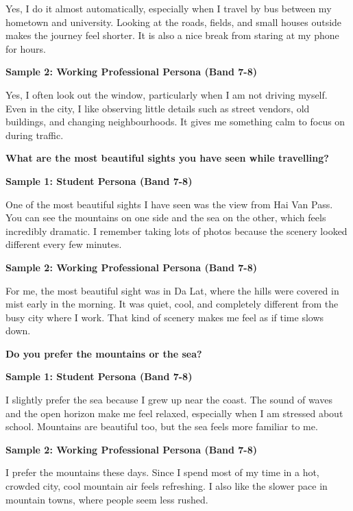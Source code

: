 Yes, I do it almost automatically, especially when I travel by bus between my hometown and university. Looking at the roads, fields, and small houses outside makes the journey feel shorter. It is also a nice break from staring at my phone for hours.

\textbf{Sample 2: Working Professional Persona (Band 7-8)}

Yes, I often look out the window, particularly when I am not driving myself. Even in the city, I like observing little details such as street vendors, old buildings, and changing neighbourhoods. It gives me something calm to focus on during traffic.

\separator

\begin{ieltsquestion}
\textbf{What are the most beautiful sights you have seen while travelling?}
\end{ieltsquestion}
\textbf{Sample 1: Student Persona (Band 7-8)}

One of the most beautiful sights I have seen was the view from Hai Van Pass. You can see the mountains on one side and the sea on the other, which feels incredibly dramatic. I remember taking lots of photos because the scenery looked different every few minutes.

\textbf{Sample 2: Working Professional Persona (Band 7-8)}

For me, the most beautiful sight was in Da Lat, where the hills were covered in mist early in the morning. It was quiet, cool, and completely different from the busy city where I work. That kind of scenery makes me feel as if time slows down.

\separator

\begin{ieltsquestion}
\textbf{Do you prefer the mountains or the sea?}
\end{ieltsquestion}
\textbf{Sample 1: Student Persona (Band 7-8)}

I slightly prefer the sea because I grew up near the coast. The sound of waves and the open horizon make me feel relaxed, especially when I am stressed about school. Mountains are beautiful too, but the sea feels more familiar to me.

\textbf{Sample 2: Working Professional Persona (Band 7-8)}

I prefer the mountains these days. Since I spend most of my time in a hot, crowded city, cool mountain air feels refreshing. I also like the slower pace in mountain towns, where people seem less rushed.

